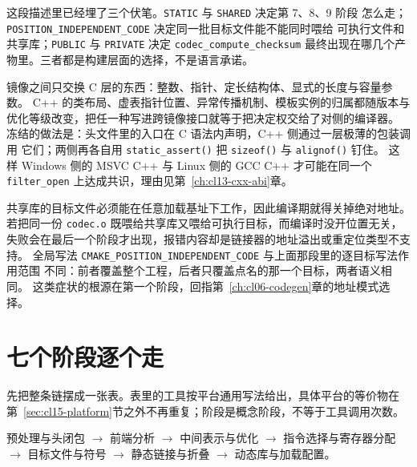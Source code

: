\documentclass[12pt,a4paper,fontset=fandol]{ctexbook}
\newcommand{\cpp}[1]{C++#1}
\newcommand{\Fn}[1]{\texttt{#1()}}
\newcommand{\Tp}[1]{\texttt{#1}}
\newcommand{\Bk}{\discretionary{}{}{}}
\newcommand{\Lang}[1]{\textsf{#1}}
\newcommand{\CL}{\Lang{C}}
\newcommand{\Sym}[1]{\texttt{#1}}
\newcommand{\Mx}[1]{\textsf{#1}}
\newcommand{\Nix}{\textsf{Linux}}
\newcommand{\Win}{\textsf{Windows}}
\begin{document}
这段描述里已经埋了三个伏笔。\Tp{STATIC} 与 \Tp{SHARED} 决定第 7、8、9 阶段
怎么走；\Tp{POSITION\_INDEPENDENT{\Bk}\_CODE} 决定同一批目标文件能不能同时喂给
可执行文件和共享库；\Tp{PUBLIC} 与 \Tp{PRIVATE} 决定 \Sym{codec\_compute\_checksum}
最终出现在哪几个产物里。三者都是构建层面的选择，不是语言承诺。

\begin{abibox}[title={为什么接口层要冻结成 \CL{} 而非 \cpp{}}]
镜像之间只交换 \CL{} 层的东西：整数、指针、定长结构体、显式的长度与容量参数。
\cpp{} 的类布局、虚表指针位置、异常传播机制、模板实例的归属都随版本与
优化等级改变，把任一种写进跨镜像接口就等于把决定权交给了对侧的编译器。
冻结的做法是：头文件里的入口在 \CL{} 语法内声明，\cpp{} 侧通过一层极薄的包装调用
它们；两侧再各自用 \Fn{static\_assert} 把 \Fn{sizeof} 与 \Fn{alignof} 钉住。
这样 \Win{} 侧的 \Mx{MSVC C++} 与 \Nix{} 侧的 \Mx{GCC C++} 才可能在同一个
\Sym{filter\_open} 上达成共识，理由见第~\ref{ch:cl13-cxx-abi}章。
\end{abibox}

\begin{warning}[title={位置无关代码不是可选项，是链接期的入场券}]
共享库的目标文件必须能在任意加载基址下工作，因此编译期就得关掉绝对地址。
若把同一份 \Tp{codec.o} 既喂给共享库又喂给可执行目标，而编译时没开位置无关，
失败会在最后一个阶段才出现，报错内容却是链接器的地址溢出或重定位类型不支持。
全局写法 \Tp{CMAKE\_POSITION\_INDEPENDENT{\Bk}\_CODE} 与上面那段里的逐目标写法作用范围
不同：前者覆盖整个工程，后者只覆盖点名的那一个目标，两者语义相同。
这类症状的根源在第一个阶段，回指第~\ref{ch:cl06-codegen}章的地址模式选择。
\end{warning}

\section{七个阶段逐个走}\label{sec:cl15-stages}

先把整条链摆成一张表。表里的工具按平台通用写法给出，具体平台的等价物在
第~\ref{sec:cl15-platform}节之外不再重复；阶段是概念阶段，不等于工具调用次数。

\begin{flow}[title={本章要走完的七步}]
预处理与头闭包 $\rightarrow$ 前端分析 $\rightarrow$ 中间表示与优化 $\rightarrow$
指令选择与寄存器分配 $\rightarrow$ 目标文件与符号 $\rightarrow$
静态链接与折叠 $\rightarrow$ 动态库与加载配置。
\end{flow}
\end{document}

